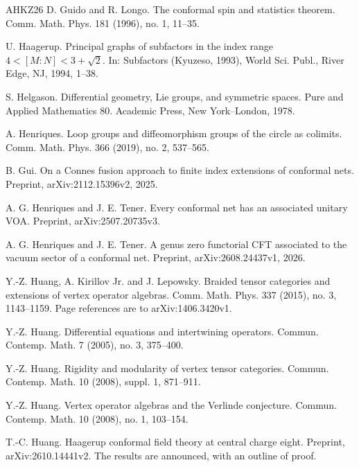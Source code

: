 \documentclass[leqno]{article}
\numberwithin{equation}{section}
\begin{document}
\begin{thebibliography}{AHKZ26}
D. Guido and R. Longo.
\newblock The conformal spin and statistics theorem.
\newblock Comm. Math. Phys. 181 (1996), no. 1, 11--35.

U. Haagerup.
\newblock Principal graphs of subfactors in the index range $4 < [M:N] < 3+\sqrt2$.
\newblock In: Subfactors (Kyuzeso, 1993), World Sci. Publ., River Edge, NJ, 1994, 1--38.

S. Helgason.
\newblock Differential geometry, Lie groups, and symmetric spaces.
\newblock Pure and Applied Mathematics 80. Academic Press, New York--London, 1978.

A. Henriques.
\newblock Loop groups and diffeomorphism groups of the circle as colimits.
\newblock Comm. Math. Phys. 366 (2019), no. 2, 537--565.

B. Gui.
\newblock On a Connes fusion approach to finite index extensions of conformal nets.
\newblock Preprint, arXiv:2112.15396v2, 2025.

A. G. Henriques and J. E. Tener.
\newblock Every conformal net has an associated unitary VOA.
\newblock Preprint, arXiv:2507.20735v3.

A. G. Henriques and J. E. Tener.
\newblock A genus zero functorial CFT associated to the vacuum sector of a conformal net.
\newblock Preprint, arXiv:2608.24437v1, 2026.

Y.-Z. Huang, A. Kirillov Jr. and J. Lepowsky.
\newblock Braided tensor categories and extensions of vertex operator algebras.
\newblock Comm. Math. Phys. 337 (2015), no. 3, 1143--1159. Page references are to arXiv:1406.3420v1.

Y.-Z. Huang.
\newblock Differential equations and intertwining operators.
\newblock Commun. Contemp. Math. 7 (2005), no. 3, 375--400.

Y.-Z. Huang.
\newblock Rigidity and modularity of vertex tensor categories.
\newblock Commun. Contemp. Math. 10 (2008), suppl. 1, 871--911.

Y.-Z. Huang.
\newblock Vertex operator algebras and the Verlinde conjecture.
\newblock Commun. Contemp. Math. 10 (2008), no. 1, 103--154.

T.-C. Huang.
\newblock Haagerup conformal field theory at central charge eight.
\newblock Preprint, arXiv:2610.14441v2. The results are announced, with an outline of proof.


\end{thebibliography}
\end{document}
